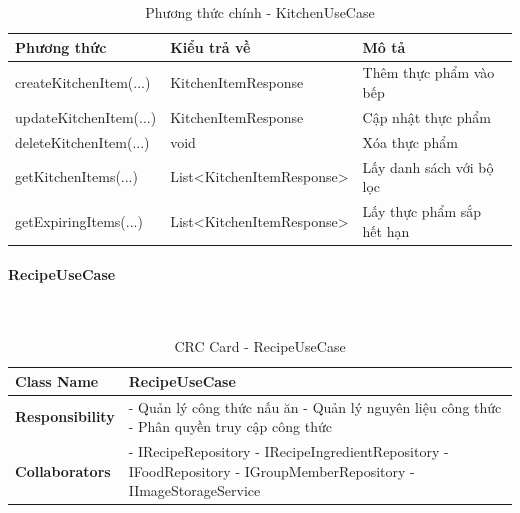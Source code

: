 \begin{table}[H]
\small
\renewcommand{\arraystretch}{1.3}
\begin{tabularx}{\textwidth}{|>{\raggedright\arraybackslash}p{5cm}|>{\raggedright\arraybackslash}p{3.5cm}|X|}
\hline
\rowcolor{gray!20}
\textbf{Phương thức} & \textbf{Kiểu trả về} & \textbf{Mô tả} \\
\hline
createKitchenItem(...) & KitchenItemResponse & Thêm thực phẩm vào bếp \\
\hline
updateKitchenItem(...) & KitchenItemResponse & Cập nhật thực phẩm \\
\hline
deleteKitchenItem(...) & void & Xóa thực phẩm \\
\hline
getKitchenItems(...) & List<KitchenItemResponse> & Lấy danh sách với bộ lọc \\
\hline
getExpiringItems(...) & List<KitchenItemResponse> & Lấy thực phẩm sắp hết hạn \\
\hline
\end{tabularx}
\caption{Phương thức chính - KitchenUseCase}
\end{table}

\paragraph{RecipeUseCase} ~\\

\begin{table}[H]
\small
\renewcommand{\arraystretch}{1.3}
\begin{tabularx}{\textwidth}{|>{\raggedright\arraybackslash}p{3.5cm}|X|}
\hline
\rowcolor{gray!20}
\textbf{Class Name} & RecipeUseCase \\
\hline
\textbf{Responsibility} & - Quản lý công thức nấu ăn \newline - Quản lý nguyên liệu công thức \newline - Phân quyền truy cập công thức \\
\hline
\textbf{Collaborators} & - IRecipeRepository \newline - IRecipeIngredientRepository \newline - IFoodRepository \newline - IGroupMemberRepository \newline - IImageStorageService \\
\hline
\end{tabularx}
\caption{CRC Card - RecipeUseCase}
\end{table}

